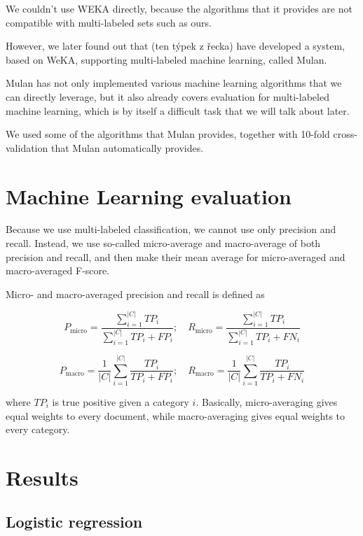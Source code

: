 \documentclass[letterpaper]{article}
\begin{document}
We couldn't use WEKA directly, because the algorithms that it provides are not compatible with multi-labeled sets such as ours. 

However, we later found out  that (ten týpek z řecka) have developed a system, 
based on WeKA, supporting multi-labeled machine learning, called Mulan.

Mulan has not only implemented various machine learning algorithms that we can directly leverage, but it also already 
covers evaluation for multi-labeled machine learning, which is by itself a difficult task that we will talk about later.

We used some of the algorithms that Mulan provides, together with 10-fold cross-validation that Mulan automatically provides.

\section{Machine Learning evaluation}
Because we use multi-labeled classification, we cannot use only precision and recall. Instead, we use so-called micro-average and macro-average of both precision and recall, and then make their mean average for micro-averaged and macro-averaged F-score.

Micro- and macro-averaged precision and recall is defined as  

$$P_{\mathrm{micro}} = \frac{\sum_{i=1}^{|C|}TP_{i}}{\sum_{i=1}^{|C|}TP_{i}+FP_{i}}; \quad R_{\mathrm{micro}} = \frac{\sum_{i=1}^{|C|}TP_{i}}{\sum_{i=1}^{|C|}TP_{i}+FN_{i}}$$

$$P_{\mathrm{macro}}=\frac{1}{|C|}\sum_{i=1}^{|C|}\frac{TP_{i}}{TP_{i}+FP_{i}};\quad R_{\mathrm{macro}}=\frac{1}{|C|}\sum_{i=1}^{|C|}\frac{TP_{i}}{TP_{i}+FN_{i}}$$

where $TP_i$ is true positive given a category $i$. Basically, micro-averaging gives equal weights to every document, while macro-averaging gives equal weights to every category.

\section{Results}
\subsection{Logistic regression}
\end{document}
